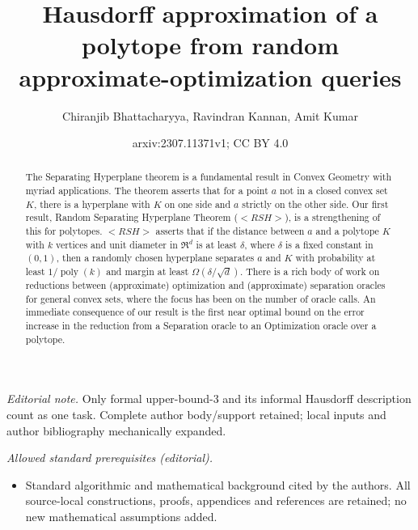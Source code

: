 \documentclass[11pt,letterpaper]{article}
\title{Hausdorff approximation of a polytope from random approximate-optimization queries}
\author{Chiranjib Bhattacharyya, Ravindran Kannan, Amit Kumar}
\date{arxiv:2307.11371v1; CC BY 4.0}
\newcounter{note}[section]
\def\mathsf#1{<#1>}%
\def\xspace{}%
\theoremstyle{definition}
\theoremstyle{remark}
\newcommand{\poly}{\operatorname{poly}}
\newcommand{\rsh}{{\mathsf {RSH}}\xspace}
\begin{document}
\maketitle
\noindent\textit{Editorial note.} Only formal upper-bound-3 and its informal Hausdorff description count as one task. Complete author body/support retained; local inputs and author bibliography mechanically expanded.\par\medskip
\noindent\textit{Allowed standard prerequisites (editorial).}\begin{itemize}
\item Standard algorithmic and mathematical background cited by the authors. All source-local constructions, proofs, appendices and references are retained; no new mathematical assumptions added.
\end{itemize}\medskip
\begin{abstract}
The Separating Hyperplane theorem  is a fundamental result in Convex Geometry with myriad applications. The theorem asserts that for a point $a$ not in a closed convex set $K$, there is a hyperplane with $K$ on one side and $a$ strictly on the other side. Our first result, Random Separating Hyperplane  Theorem ($\rsh$), is a strengthening of this for polytopes. $\rsh$ asserts that if the distance between $a$ and a polytope $K$ with $k$ vertices and unit diameter in $\Re^d$ is at least $\delta$, where $\delta$ is a fixed constant in $(0,1)$, then a randomly chosen hyperplane separates $a$ and $K$ with probability at least $1/\poly(k)$ and  margin at least $\Omega \left( \delta/\sqrt{d} \right)$.
There is  a rich body of work on reductions between (approximate) optimization and (approximate) separation oracles for general convex sets, where the focus has been on the number of oracle calls. 
An immediate consequence of our result is the first near optimal bound on the error increase in the reduction from a Separation oracle to an Optimization oracle over a polytope.


\end{abstract}
\end{document}
